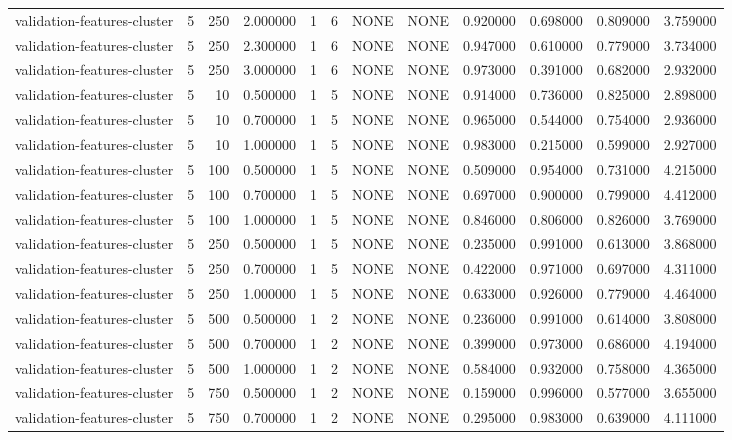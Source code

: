 \begin{tabular}{lrrrllllrrrr}
validation-features-cluster & 5 & 250 & 2.000000 & 1 & 6 & NONE & NONE & 0.920000 & 0.698000 & 0.809000 & 3.759000 \\
validation-features-cluster & 5 & 250 & 2.300000 & 1 & 6 & NONE & NONE & 0.947000 & 0.610000 & 0.779000 & 3.734000 \\
validation-features-cluster & 5 & 250 & 3.000000 & 1 & 6 & NONE & NONE & 0.973000 & 0.391000 & 0.682000 & 2.932000 \\
validation-features-cluster & 5 & 10 & 0.500000 & 1 & 5 & NONE & NONE & 0.914000 & 0.736000 & 0.825000 & 2.898000 \\
validation-features-cluster & 5 & 10 & 0.700000 & 1 & 5 & NONE & NONE & 0.965000 & 0.544000 & 0.754000 & 2.936000 \\
validation-features-cluster & 5 & 10 & 1.000000 & 1 & 5 & NONE & NONE & 0.983000 & 0.215000 & 0.599000 & 2.927000 \\
validation-features-cluster & 5 & 100 & 0.500000 & 1 & 5 & NONE & NONE & 0.509000 & 0.954000 & 0.731000 & 4.215000 \\
validation-features-cluster & 5 & 100 & 0.700000 & 1 & 5 & NONE & NONE & 0.697000 & 0.900000 & 0.799000 & 4.412000 \\
validation-features-cluster & 5 & 100 & 1.000000 & 1 & 5 & NONE & NONE & 0.846000 & 0.806000 & 0.826000 & 3.769000 \\
validation-features-cluster & 5 & 250 & 0.500000 & 1 & 5 & NONE & NONE & 0.235000 & 0.991000 & 0.613000 & 3.868000 \\
validation-features-cluster & 5 & 250 & 0.700000 & 1 & 5 & NONE & NONE & 0.422000 & 0.971000 & 0.697000 & 4.311000 \\
validation-features-cluster & 5 & 250 & 1.000000 & 1 & 5 & NONE & NONE & 0.633000 & 0.926000 & 0.779000 & 4.464000 \\
validation-features-cluster & 5 & 500 & 0.500000 & 1 & 2 & NONE & NONE & 0.236000 & 0.991000 & 0.614000 & 3.808000 \\
validation-features-cluster & 5 & 500 & 0.700000 & 1 & 2 & NONE & NONE & 0.399000 & 0.973000 & 0.686000 & 4.194000 \\
validation-features-cluster & 5 & 500 & 1.000000 & 1 & 2 & NONE & NONE & 0.584000 & 0.932000 & 0.758000 & 4.365000 \\
validation-features-cluster & 5 & 750 & 0.500000 & 1 & 2 & NONE & NONE & 0.159000 & 0.996000 & 0.577000 & 3.655000 \\
validation-features-cluster & 5 & 750 & 0.700000 & 1 & 2 & NONE & NONE & 0.295000 & 0.983000 & 0.639000 & 4.111000 \\

\end{tabular}
